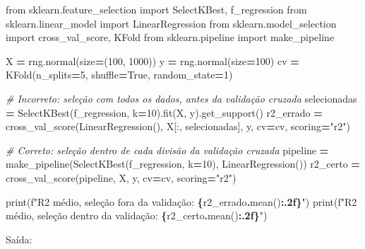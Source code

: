 \documentclass[
]{book}
\newenvironment{Shaded}{\begin{snugshade}}{\end{snugshade}}
\newcommand{\BuiltInTok}[1]{#1}
\newcommand{\CommentTok}[1]{\textcolor[rgb]{0.56,0.35,0.01}{\textit{#1}}}
\newcommand{\DecValTok}[1]{\textcolor[rgb]{0.00,0.00,0.81}{#1}}
\newcommand{\ImportTok}[1]{#1}
\newcommand{\NormalTok}[1]{#1}
\newcommand{\OperatorTok}[1]{\textcolor[rgb]{0.81,0.36,0.00}{\textbf{#1}}}
\newcommand{\SpecialCharTok}[1]{\textcolor[rgb]{0.81,0.36,0.00}{\textbf{#1}}}
\newcommand{\SpecialStringTok}[1]{\textcolor[rgb]{0.31,0.60,0.02}{#1}}
\newcommand{\StringTok}[1]{\textcolor[rgb]{0.31,0.60,0.02}{#1}}
\newcommand{\VariableTok}[1]{\textcolor[rgb]{0.00,0.00,0.00}{#1}}
\begin{document}
\begin{Shaded}
\begin{Highlighting}[]
\ImportTok{from}\NormalTok{ sklearn.feature\_selection }\ImportTok{import}\NormalTok{ SelectKBest, f\_regression}
\ImportTok{from}\NormalTok{ sklearn.linear\_model }\ImportTok{import}\NormalTok{ LinearRegression}
\ImportTok{from}\NormalTok{ sklearn.model\_selection }\ImportTok{import}\NormalTok{ cross\_val\_score, KFold}
\ImportTok{from}\NormalTok{ sklearn.pipeline }\ImportTok{import}\NormalTok{ make\_pipeline}

\NormalTok{X }\OperatorTok{=}\NormalTok{ rng.normal(size}\OperatorTok{=}\NormalTok{(}\DecValTok{100}\NormalTok{, }\DecValTok{1000}\NormalTok{))}
\NormalTok{y }\OperatorTok{=}\NormalTok{ rng.normal(size}\OperatorTok{=}\DecValTok{100}\NormalTok{)}
\NormalTok{cv }\OperatorTok{=}\NormalTok{ KFold(n\_splits}\OperatorTok{=}\DecValTok{5}\NormalTok{, shuffle}\OperatorTok{=}\VariableTok{True}\NormalTok{, random\_state}\OperatorTok{=}\DecValTok{1}\NormalTok{)}

\CommentTok{\# Incorreto: seleção com todos os dados, antes da validação cruzada}
\NormalTok{selecionadas }\OperatorTok{=}\NormalTok{ SelectKBest(f\_regression, k}\OperatorTok{=}\DecValTok{10}\NormalTok{).fit(X, y).get\_support()}
\NormalTok{r2\_errado }\OperatorTok{=}\NormalTok{ cross\_val\_score(LinearRegression(), X[:, selecionadas], y, cv}\OperatorTok{=}\NormalTok{cv, scoring}\OperatorTok{=}\StringTok{"r2"}\NormalTok{)}

\CommentTok{\# Correto: seleção dentro de cada divisão da validação cruzada}
\NormalTok{pipeline }\OperatorTok{=}\NormalTok{ make\_pipeline(SelectKBest(f\_regression, k}\OperatorTok{=}\DecValTok{10}\NormalTok{), LinearRegression())}
\NormalTok{r2\_certo }\OperatorTok{=}\NormalTok{ cross\_val\_score(pipeline, X, y, cv}\OperatorTok{=}\NormalTok{cv, scoring}\OperatorTok{=}\StringTok{"r2"}\NormalTok{)}

\BuiltInTok{print}\NormalTok{(}\SpecialStringTok{f"R2 médio, seleção fora da validação: }\SpecialCharTok{\{}\NormalTok{r2\_errado}\SpecialCharTok{.}\NormalTok{mean()}\SpecialCharTok{:.2f\}}\SpecialStringTok{"}\NormalTok{)}
\BuiltInTok{print}\NormalTok{(}\SpecialStringTok{f"R2 médio, seleção dentro da validação: }\SpecialCharTok{\{}\NormalTok{r2\_certo}\SpecialCharTok{.}\NormalTok{mean()}\SpecialCharTok{:.2f\}}\SpecialStringTok{"}\NormalTok{)}
\end{Highlighting}
\end{Shaded}

Saída:
\end{document}
